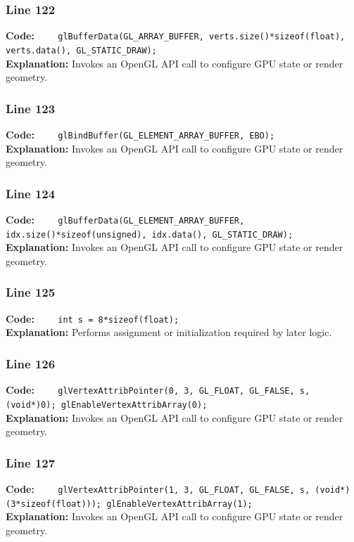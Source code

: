 \documentclass[11pt,a4paper]{article}
\begin{document}
\subsubsection*{Line 122}
\textbf{Code:} \verb|    glBufferData(GL_ARRAY_BUFFER, verts.size()*sizeof(float), verts.data(), GL_STATIC_DRAW);|\\
\textbf{Explanation:} Invokes an OpenGL API call to configure GPU state or render geometry.

\subsubsection*{Line 123}
\textbf{Code:} \verb|    glBindBuffer(GL_ELEMENT_ARRAY_BUFFER, EBO);|\\
\textbf{Explanation:} Invokes an OpenGL API call to configure GPU state or render geometry.

\subsubsection*{Line 124}
\textbf{Code:} \verb|    glBufferData(GL_ELEMENT_ARRAY_BUFFER, idx.size()*sizeof(unsigned), idx.data(), GL_STATIC_DRAW);|\\
\textbf{Explanation:} Invokes an OpenGL API call to configure GPU state or render geometry.

\subsubsection*{Line 125}
\textbf{Code:} \verb|    int s = 8*sizeof(float);|\\
\textbf{Explanation:} Performs assignment or initialization required by later logic.

\subsubsection*{Line 126}
\textbf{Code:} \verb|    glVertexAttribPointer(0, 3, GL_FLOAT, GL_FALSE, s, (void*)0); glEnableVertexAttribArray(0);|\\
\textbf{Explanation:} Invokes an OpenGL API call to configure GPU state or render geometry.

\subsubsection*{Line 127}
\textbf{Code:} \verb|    glVertexAttribPointer(1, 3, GL_FLOAT, GL_FALSE, s, (void*)(3*sizeof(float))); glEnableVertexAttribArray(1);|\\
\textbf{Explanation:} Invokes an OpenGL API call to configure GPU state or render geometry.
\end{document}
